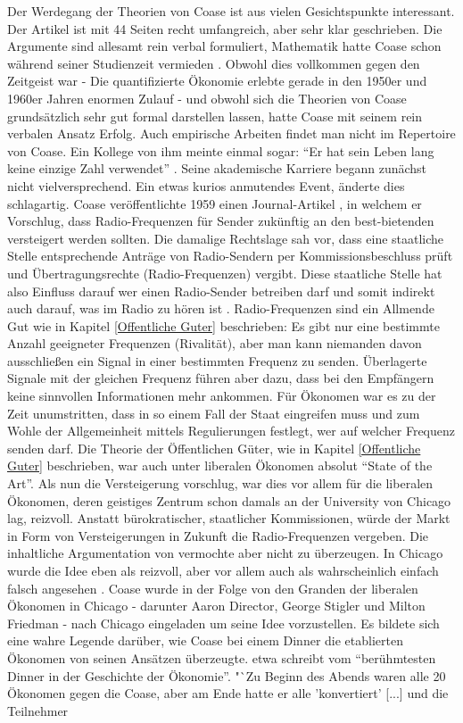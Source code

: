 Der Werdegang der Theorien von Coase ist aus vielen Gesichtspunkte interessant. Der Artikel \textcite{Coase1960} ist mit 44 Seiten recht umfangreich, aber sehr klar geschrieben. Die Argumente sind allesamt rein verbal formuliert, Mathematik hatte Coase schon während seiner Studienzeit vermieden \parencite{Coase1991a}. Obwohl dies vollkommen gegen den Zeitgeist war - Die quantifizierte Ökonomie erlebte gerade in den 1950er und 1960er Jahren enormen Zulauf - und obwohl sich die Theorien von Coase grundsätzlich sehr gut formal darstellen lassen, hatte Coase mit seinem rein verbalen Ansatz Erfolg. Auch empirische Arbeiten findet man nicht im Repertoire von Coase. Ein Kollege von ihm meinte einmal sogar: "`Er hat sein Leben lang keine einzige Zahl verwendet"' \parencite[S. 111]{Warsh}. Seine akademische Karriere begann zunächst nicht vielversprechend. Ein etwas kurios anmutendes Event, änderte dies schlagartig. Coase veröffentlichte 1959 einen Journal-Artikel \parencite{Coase1959}, in welchem er Vorschlug, dass Radio-Frequenzen für Sender zukünftig an den best-bietenden versteigert werden sollten. Die damalige Rechtslage sah vor, dass eine staatliche Stelle entsprechende Anträge von Radio-Sendern per Kommissionsbeschluss prüft und Übertragungsrechte (Radio-Frequenzen) vergibt. Diese staatliche Stelle hat also Einfluss darauf wer einen Radio-Sender betreiben darf und somit indirekt auch darauf, was im Radio zu hören ist \parencite[S. 879]{Coase1959}. Radio-Frequenzen sind ein Allmende Gut wie in Kapitel \ref{Offentliche Guter} beschrieben: Es gibt nur eine bestimmte Anzahl geeigneter Frequenzen (Rivalität), aber man kann niemanden davon ausschließen ein Signal in einer bestimmten Frequenz zu senden. Überlagerte Signale mit der gleichen Frequenz führen aber dazu, dass bei den Empfängern keine sinnvollen Informationen mehr ankommen. Für Ökonomen war es zu der Zeit unumstritten, dass in so einem Fall der Staat eingreifen muss und zum Wohle der Allgemeinheit mittels Regulierungen festlegt, wer auf welcher Frequenz senden darf. Die Theorie der Öffentlichen Güter, wie in Kapitel \ref{Offentliche Guter} beschrieben, war auch unter liberalen Ökonomen absolut "`State of the Art"'. Als \textcite{Coase1959} nun die Versteigerung vorschlug, war dies vor allem für die liberalen Ökonomen, deren geistiges Zentrum schon damals an der University von Chicago lag, reizvoll. Anstatt bürokratischer, staatlicher Kommissionen, würde der Markt in Form von Versteigerungen in Zukunft die Radio-Frequenzen vergeben. Die inhaltliche Argumentation von \textcite{Coase1959} vermochte aber nicht zu überzeugen. In Chicago wurde die Idee eben als reizvoll, aber vor allem auch als wahrscheinlich einfach falsch angesehen \parencite{Coase1991a}. Coase wurde in der Folge von den Granden der liberalen Ökonomen in Chicago - darunter Aaron Director, George Stigler und Milton Friedman - nach Chicago eingeladen um seine Idee vorzustellen. Es bildete sich eine wahre Legende \parencite[S. 113]{Warsh} darüber, wie Coase bei einem Dinner die etablierten Ökonomen von seinen Ansätzen überzeugte. \textcite[S. 45]{Schlafly2007} etwa schreibt vom "`berühmtesten Dinner in der Geschichte der Ökonomie"'. "`Zu Beginn des Abends waren alle 20 Ökonomen gegen die Coase, aber am Ende hatte er alle 'konvertiert' [...] und die Teilnehmer 